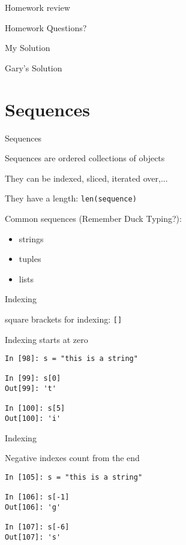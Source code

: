 \documentclass{beamer}
\begin{document}
\begin{frame}{Homework review}

  \vfill
  {\Large Homework Questions? }

  \vfill
  {\Large My Solution}

  \vfill
  {\Large Gary's Solution}

\end{frame}

\section {Sequences}

\begin{frame}[fragile]{Sequences}

{\Large Sequences are ordered collections of objects}

\vfill
{\Large They can be indexed, sliced, iterated over,...}

\vfill
{\Large They have a length:  \verb+len(sequence)+}

\vfill
{\Large Common sequences (Remember Duck Typing?):}

{\Large
\begin{itemize}
   \item strings
   \item tuples
   \item lists
\end{itemize}
}

\end{frame}

\begin{frame}[fragile]{Indexing}

{\Large square brackets for indexing: \verb+[]+}

\vfill
{\Large Indexing starts at zero}

\begin{verbatim}
In [98]: s = "this is a string"

In [99]: s[0]
Out[99]: 't'

In [100]: s[5]
Out[100]: 'i'
\end{verbatim}

\end{frame}

\begin{frame}[fragile]{Indexing}

{\Large Negative indexes count from the end}

\vfill
\begin{verbatim}
In [105]: s = "this is a string"

In [106]: s[-1]
Out[106]: 'g'

In [107]: s[-6]
Out[107]: 's'
\end{verbatim}

\end{frame}
\end{document}

